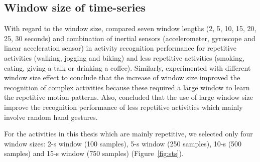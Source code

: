 \subsection{Window size of time-series}
With regard to the window size, \cite{shoaib2016} compared 
seven window lengths (2, 5, 10, 15, 20, 25, 30 seconds)
and combination of inertial sensors (accelerometer, gyroscope and linear 
acceleration sensor) in activity recognition performance for repetitive 
activities (walking, jogging and biking) and less repetitive activities 
(smoking, eating, giving a talk or drinking a coffee).
Similarly, \cite{shoaib2016} experimented with different window size effect 
to conclude that the increase of window size improved the recognition of 
complex activities because these required a large window to learn the 
repetitive motion patterns. Also, \cite{shoaib2016} concluded that the use 
of large window size improve the recognition performance of less repetitive 
activities which mainly involve random hand gestures.

For the activities in this thesis which are mainly repetitive, we selected 
only four window sizes: 2-s window (100 samples), 5-s window (250 samples), 
10-s (500 samples) and 15-s window (750 samples) (Figure~\ref{fig:sts}).




